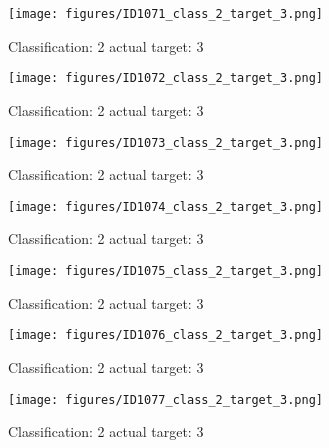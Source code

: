 \begin{figure}[h!]
\begin{center}
\texttt{[image: figures/ID1071\_class\_2\_target\_3.png]}
\end{center}
\caption{ Classification: 2 actual target: 3}
\label{fig:ID1071_class_2_target_3}
\end{figure}
\begin{figure}[h!]
\begin{center}
\texttt{[image: figures/ID1072\_class\_2\_target\_3.png]}
\end{center}
\caption{ Classification: 2 actual target: 3}
\label{fig:ID1072_class_2_target_3}
\end{figure}
\begin{figure}[h!]
\begin{center}
\texttt{[image: figures/ID1073\_class\_2\_target\_3.png]}
\end{center}
\caption{ Classification: 2 actual target: 3}
\label{fig:ID1073_class_2_target_3}
\end{figure}
\begin{figure}[h!]
\begin{center}
\texttt{[image: figures/ID1074\_class\_2\_target\_3.png]}
\end{center}
\caption{ Classification: 2 actual target: 3}
\label{fig:ID1074_class_2_target_3}
\end{figure}
\begin{figure}[h!]
\begin{center}
\texttt{[image: figures/ID1075\_class\_2\_target\_3.png]}
\end{center}
\caption{ Classification: 2 actual target: 3}
\label{fig:ID1075_class_2_target_3}
\end{figure}
\begin{figure}[h!]
\begin{center}
\texttt{[image: figures/ID1076\_class\_2\_target\_3.png]}
\end{center}
\caption{ Classification: 2 actual target: 3}
\label{fig:ID1076_class_2_target_3}
\end{figure}
\begin{figure}[h!]
\begin{center}
\texttt{[image: figures/ID1077\_class\_2\_target\_3.png]}
\end{center}
\caption{ Classification: 2 actual target: 3}
\label{fig:ID1077_class_2_target_3}
\end{figure}
